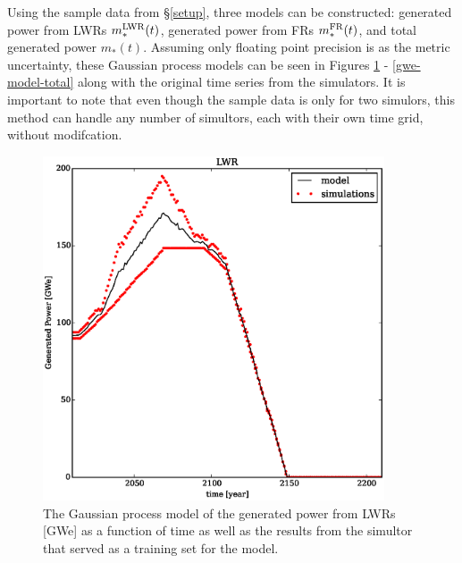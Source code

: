 Using the sample data from \S\ref{setup}, three models can be constructed:
generated power from LWRs $m_*^{\mathrm{LWR}}(t)$, generated power from FRs $m_*^{\mathrm{FR}}(t)$, 
and total generated power $m_*(t)$. Assuming only floating point precision is as 
the metric uncertainty, these Gaussian process models can be seen in Figures 
\ref{gwe-model-lwr} - \ref{gwe-model-total} along with the original time series 
from the simulators.
It is important to note that even though the sample data is only for two simulors, 
this method can handle any number of simultors, each with their own time grid, 
without modifcation.

\begin{figure}[htb]
\centering
\includegraphics[width=0.9\textwidth]{gwe-model-lwr.eps}
\caption{The Gaussian process model of the generated power from LWRs [GWe] 
as a function of time as well as the results from the simultor that served as a 
training set for the model.}
\label{gwe-model-lwr}
\end{figure}

